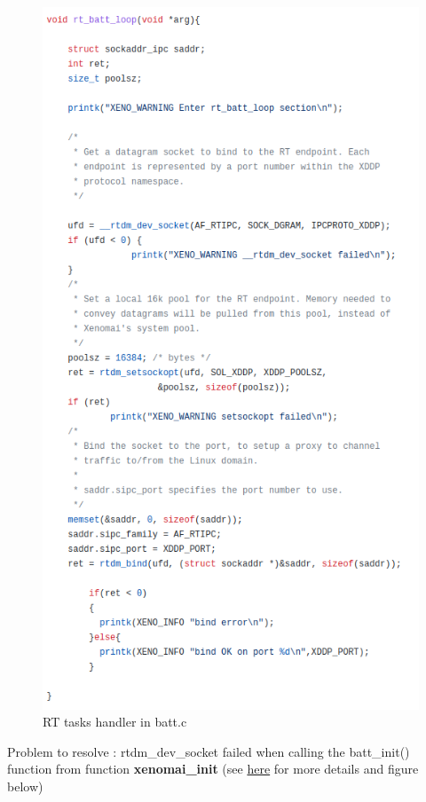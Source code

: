 \documentclass[12pt,hidelinks]{article}
\begin{document}
{	    \begin{figure}[!h]
        \centering
    	\includegraphics[scale=0.60]{battLoop.png}
    	\caption{RT tasks handler in batt.c }
    	\end{figure} \newline

        \newpage Problem to resolve : rtdm\_dev\_socket failed when calling the batt\_init() function from function \textbf{xenomai\_init} (see \href{https://github.com/skyultime/Xenomai-EDH/blob/final_version/kernel/cobalt/init.c}{here} for more details and figure below)
        
}
\end{document}
